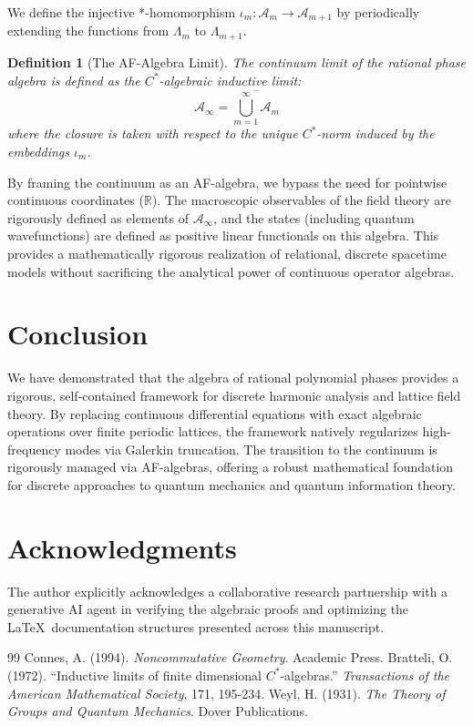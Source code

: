 \documentclass[11pt,a4paper]{article}
\newtheorem{definition}[theorem]{Definition}
\begin{document}
We define the injective *-homomorphism $\iota_m : \mathcal{A}_m \to \mathcal{A}_{m+1}$ by periodically extending the functions from $\Lambda_m$ to $\Lambda_{m+1}$. 

\begin{definition}[The AF-Algebra Limit]
The continuum limit of the rational phase algebra is defined as the $C^*$-algebraic inductive limit:
\begin{equation}
\mathcal{A}_\infty = \overline{\bigcup_{m=1}^\infty \mathcal{A}_m}
\end{equation}
where the closure is taken with respect to the unique $C^*$-norm induced by the embeddings $\iota_m$.
\end{definition}

By framing the continuum as an AF-algebra, we bypass the need for pointwise continuous coordinates ($\mathbb{R}$). The macroscopic observables of the field theory are rigorously defined as elements of $\mathcal{A}_\infty$, and the states (including quantum wavefunctions) are defined as positive linear functionals on this algebra. This provides a mathematically rigorous realization of relational, discrete spacetime models without sacrificing the analytical power of continuous operator algebras.

\section{Conclusion}
We have demonstrated that the algebra of rational polynomial phases provides a rigorous, self-contained framework for discrete harmonic analysis and lattice field theory. By replacing continuous differential equations with exact algebraic operations over finite periodic lattices, the framework natively regularizes high-frequency modes via Galerkin truncation. The transition to the continuum is rigorously managed via AF-algebras, offering a robust mathematical foundation for discrete approaches to quantum mechanics and quantum information theory.

\section{Acknowledgments}
The author explicitly acknowledges a collaborative research partnership with a generative AI agent in verifying the algebraic proofs and optimizing the \LaTeX\ documentation structures presented across this manuscript.

\begin{thebibliography}{99}
 Connes, A. (1994). \textit{Noncommutative Geometry}. Academic Press.
 Bratteli, O. (1972). ``Inductive limits of finite dimensional $C^*$-algebras.'' \textit{Transactions of the American Mathematical Society}, 171, 195-234.
 Weyl, H. (1931). \textit{The Theory of Groups and Quantum Mechanics}. Dover Publications.
\end{thebibliography}
\end{document}
